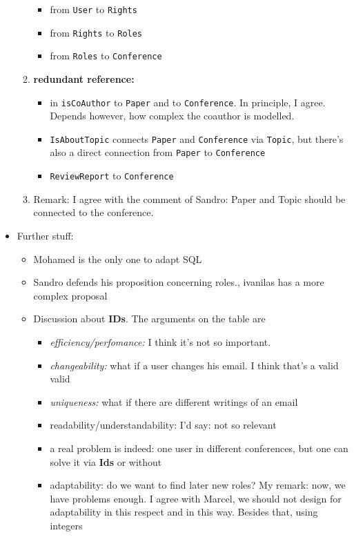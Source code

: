 \begin{itemize}
\begin{enumerate}
\begin{itemize}
  \item from \texttt{User} to \texttt{Rights}
  \item from \texttt{Rights} to \texttt{Roles}
  \item from \texttt{Roles} to \texttt{Conference}
  \end{itemize}
\item \textbf{redundant reference:} 
  \begin{itemize}
  \item  in \texttt{isCoAuthor} to \texttt{Paper}
    and to \texttt{Conference}. In principle, I agree. Depends however, how
    complex the coauthor is modelled.
  \item \texttt{IsAboutTopic} connects \texttt{Paper} and \texttt{Conference}
    via \texttt{Topic}, but there's also a direct connection from \texttt{Paper}
    to \texttt{Conference}
  \item \texttt{ReviewReport} to \texttt{Conference}
  \end{itemize}
\item Remark: I agree with the comment of Sandro: Paper and Topic should be
  connected to the conference.
\end{enumerate}
\item Further stuff:
  \begin{itemize}
  \item Mohamed is the only one to adapt SQL
  \item Sandro defends his proposition concerning roles., ivanilas  has a more
  complex proposal
\item Discussion about \textbf{IDs}. The arguments on the table are
  \begin{itemize}
  \item \emph{efficiency/perfomance:} I think it's not so important.
  \item \emph{changeability:} what if a user changes his email. I think that's
    a valid valid
  \item \emph{uniqueness:} what if there are different writings of an email
  \item \textrm{readability/understandability:} I'd say: not so relevant
  \item a real problem is indeed: one user in different conferences, but one
    can solve it via \textbf{Ids} or without
  \item adaptability: do we want to find later new roles? My remark: now, we
    have problems enough. I agree with Marcel, we should not design for
    adaptability in this respect and in this way. Besides that, using integers

\end{itemize}
\end{itemize}
\end{itemize}
